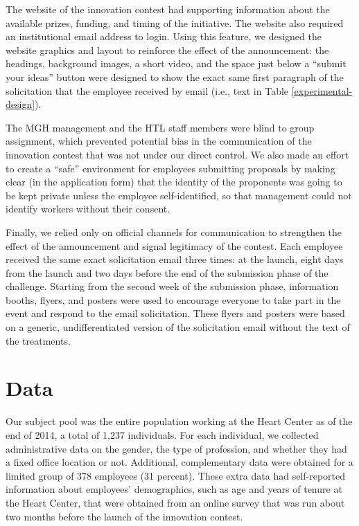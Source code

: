 \documentclass[11pt, titlepage]{article}
\begin{document}
The website of the innovation contest had supporting information about
the available prizes, funding, and timing of the initiative. The website
also required an institutional email address to login. Using this
feature, we designed the website graphics and layout to reinforce the
effect of the announcement: the headings, background images, a short
video, and the space just below a ``submit your ideas'' button were
designed to show the exact same first paragraph of the solicitation that
the employee received by email (i.e., text in Table
\ref{experimental-design}).

The MGH management and the HTL staff members were blind to group
assignment, which prevented potential bias in the communication of the
innovation contest that was not under our direct control. We also made
an effort to create a ``safe'' environment for employees submitting
proposals by making clear (in the application form) that the identity of
the proponents was going to be kept private unless the employee
self-identified, so that management could not identify workers without
their consent.

Finally, we relied only on official channels for communication to
strengthen the effect of the announcement and signal legitimacy of the
contest. Each employee received the same exact solicitation email three
times: at the launch, eight days from the launch and two days before the
end of the submission phase of the challenge. Starting from the second
week of the submission phase, information booths, flyers, and posters
were used to encourage everyone to take part in the event and respond to
the email solicitation. These flyers and posters were based on a
generic, undifferentiated version of the solicitation email without the
text of the treatments.

\section{Data}\label{data}

Our subject pool was the entire population working at the Heart Center
as of the end of 2014, a total of 1,237 individuals. For each
individual, we collected administrative data on the gender, the type of
profession, and whether they had a fixed office location or not.
Additional, complementary data were obtained for a limited group of 378
employees (31 percent). These extra data had self-reported information
about employees' demographics, such as age and years of tenure at the
Heart Center, that were obtained from an online survey that was run
about two months before the launch of the innovation contest.
\end{document}
